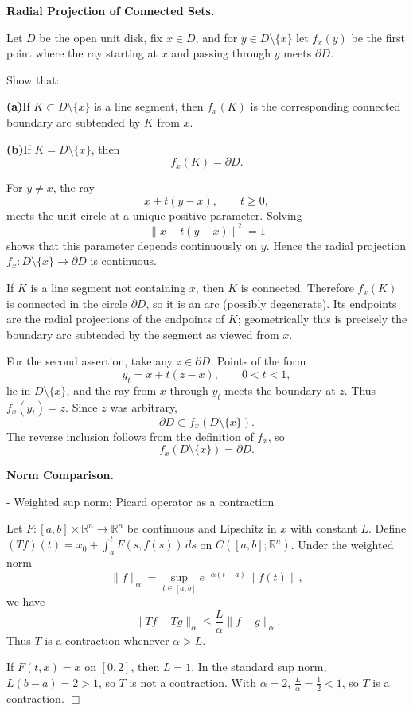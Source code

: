 \begin{problem}[CP-II-0242]
\label{prob:cp-ii-0242}
\textbf{Radial Projection of Connected Sets.}

\hspace*{1.5em}Let \(D\) be the open unit disk, fix \(x\in D\), and for \(y\in D\setminus\{x\}\)
let \(f_x(y)\) be the first point where the ray starting at \(x\) and passing through
\(y\) meets \(\partial D\).

Show that:

\par\smallskip\noindent\textbf{(a)}\quad If \(K\subset D\setminus\{x\}\) is a line segment, then \(f_x(K)\) is the
corresponding connected boundary arc subtended by \(K\) from \(x\).

\par\smallskip\noindent\textbf{(b)}\quad If \(K=D\setminus\{x\}\), then
\[
f_x(K)=\partial D.
\]
\end{problem}

\begin{solution}
For \(y\ne x\), the ray
\[
x+t(y-x),\qquad t\ge0,
\]
meets the unit circle at a unique positive parameter. Solving
\[
\|x+t(y-x)\|^2=1
\]
shows that this parameter depends continuously on \(y\). Hence the radial projection
\(f_x:D\setminus\{x\}\to\partial D\) is continuous.

If \(K\) is a line segment not containing \(x\), then \(K\) is connected. Therefore
\(f_x(K)\) is connected in the circle \(\partial D\), so it is an arc (possibly
degenerate). Its endpoints are the radial projections of the endpoints of \(K\);
geometrically this is precisely the boundary arc subtended by the segment as viewed
from \(x\).

For the second assertion, take any \(z\in\partial D\). Points of the form
\[
y_t=x+t(z-x),\qquad 0<t<1,
\]
lie in \(D\setminus\{x\}\), and the ray from \(x\) through \(y_t\) meets the boundary
at \(z\). Thus \(f_x(y_t)=z\). Since \(z\) was arbitrary,
\[
\partial D\subset f_x(D\setminus\{x\}).
\]
The reverse inclusion follows from the definition of \(f_x\), so
\[
\boxed{f_x(D\setminus\{x\})=\partial D.}
\]
\end{solution}


\begin{problem}[CP-II-0278]
\label{prob:cp-ii-0278}
\textbf{Norm Comparison.}

\hspace*{1.5em}- Weighted sup norm; Picard operator as a contraction

Let $F:[a,b]\times\mathbb{R}^n\to\mathbb{R}^n$ be continuous and Lipschitz in $x$
with constant $L$.
Define $(Tf)(t)=x_0+\int_a^t F(s,f(s))\,ds$ on $C([a,b];\mathbb{R}^n)$.
Under the weighted norm
\[
\|f\|_\alpha=\sup_{t\in[a,b]}e^{-\alpha(t-a)}\|f(t)\|,
\]
we have
\[
\|Tf-Tg\|_\alpha\le \frac{L}{\alpha}\|f-g\|_\alpha.
\]
Thus $T$ is a contraction whenever $\alpha>L$.

If $F(t,x)=x$ on $[0,2]$, then $L=1$.
In the standard sup norm, $L(b-a)=2>1$, so $T$ is not a contraction.
With $\alpha=2$, $\frac{L}{\alpha}=\frac12<1$, so $T$ is a contraction.
\hfill$\Box$

\bigskip
\bigskip
\end{problem}

